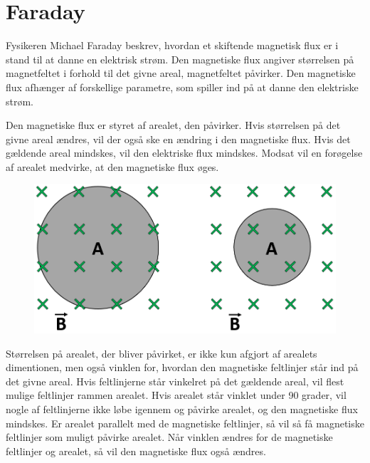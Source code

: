 \section{Faraday}
Fysikeren Michael Faraday beskrev, hvordan et skiftende magnetisk flux er i stand til at danne en elektrisk strøm. Den magnetiske flux angiver størrelsen på magnetfeltet i forhold til det givne areal, magnetfeltet påvirker. Den magnetiske flux afhænger af forskellige parametre, som spiller ind på at danne den elektriske strøm.

Den magnetiske flux er styret af arealet, den påvirker. Hvis størrelsen på det givne areal ændres, vil der også ske en ændring i den magnetiske flux. Hvis det gældende areal mindskes, vil den elektriske flux mindskes. Modsat vil en forøgelse af arealet medvirke, at den magnetiske flux øges.

\begin{figure}[H]
\includegraphics[scale=0.5]{Vildledning/Schematics/Areal_Bfelt}
\end{figure}

Størrelsen på arealet, der bliver påvirket, er ikke kun afgjort af arealets dimentionen, men også vinklen for, hvordan den magnetiske feltlinjer står ind på det givne areal. Hvis feltlinjerne står vinkelret på det gældende areal, vil flest mulige feltlinjer rammen arealet. Hvis arealet står vinklet under 90 grader, vil nogle af feltlinjerne ikke løbe igennem og påvirke arealet, og den magnetiske flux mindskes. Er arealet parallelt med de magnetiske feltlinjer, så vil så få magnetiske feltlinjer som muligt påvirke arealet. Når vinklen ændres for de magnetiske feltlinjer og arealet, så vil den magnetiske flux også ændres.

